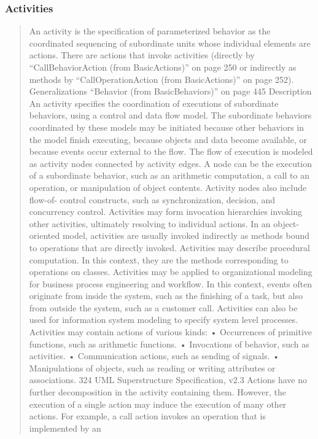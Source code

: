 \subsubsection{Activities}
\begin{quotation}
An activity is the specification of parameterized behavior as the coordinated sequencing of subordinate units whose
individual elements are actions. There are actions that invoke activities (directly by “CallBehaviorAction (from
BasicActions)” on page 250 or indirectly as methods by “CallOperationAction (from BasicActions)” on page 252).
Generalizations
 “Behavior (from BasicBehaviors)” on page 445
Description
An activity specifies the coordination of executions of subordinate behaviors, using a control and data flow model. The
subordinate behaviors coordinated by these models may be initiated because other behaviors in the model finish
executing, because objects and data become available, or because events occur external to the flow. The flow of execution
is modeled as activity nodes connected by activity edges. A node can be the execution of a subordinate behavior, such as
an arithmetic computation, a call to an operation, or manipulation of object contents. Activity nodes also include flow-of-
control constructs, such as synchronization, decision, and concurrency control. Activities may form invocation hierarchies
invoking other activities, ultimately resolving to individual actions. In an object-oriented model, activities are usually
invoked indirectly as methods bound to operations that are directly invoked.
Activities may describe procedural computation. In this context, they are the methods corresponding to operations on
classes. Activities may be applied to organizational modeling for business process engineering and workflow. In this
context, events often originate from inside the system, such as the finishing of a task, but also from outside the system,
such as a customer call. Activities can also be used for information system modeling to specify system level processes.
Activities may contain actions of various kinds:
• Occurrences of primitive functions, such as arithmetic functions.
• Invocations of behavior, such as activities.
• Communication actions, such as sending of signals.
• Manipulations of objects, such as reading or writing attributes or associations.
324
UML Superstructure Specification, v2.3
Actions have no further decomposition in the activity containing them. However, the execution of a single action may
induce the execution of many other actions. For example, a call action invokes an operation that is implemented by an

\end{quotation}
